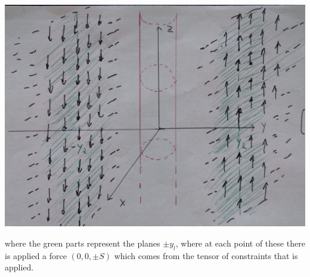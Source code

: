 \documentclass[10pt,a4paper]{book}
\begin{document}
\includegraphics[scale=0.3]{DM2}

where the green parts represent the planes $\pm y_l$, where at each point  of these there is applied a force $(0,0,\pm S)$ which comes from the tensor of constraints that is applied.
\end{document}
